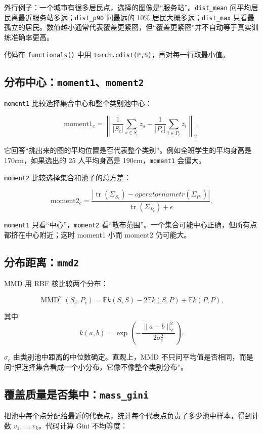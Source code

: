 \documentclass[UTF8,a4paper,12pt]{ctexart}
\newcommand{\code}[1]{\texttt{#1}}
\begin{document}
外行例子：一个城市有很多居民点，选择的图像是“服务站”。\code{dist\_mean} 问平均居民离最近服务站多远；\code{dist\_p90} 问最远的 10\% 居民大概多远；\code{dist\_max} 只看最孤立的居民。数值越小通常代表覆盖更紧密，但“覆盖更紧密”并不自动等于真实训练准确率更高。

代码在 \code{functionals()} 中用 \code{torch.cdist(P,S)}，再对每一行取最小值。

\subsection{分布中心：\code{moment1}、\code{moment2}}

\code{moment1} 比较选择集合中心和整个类别池中心：

\[
\text{moment1}_c=
\left\lVert\frac{1}{|S_c|}\sum_{s\in S_c}z_s-
\frac{1}{|P_c|}\sum_{i\in P_c}z_i\right\rVert_2.
\]

它回答“挑出来的图的平均位置是否代表整个类别”。例如全班学生的平均身高是 170cm，如果选出的 25 人平均身高是 190cm，\code{moment1} 会偏大。

\code{moment2} 比较选择集合和池子的总方差：

\[
\text{moment2}_c=
\frac{|\operatorname{tr}(\Sigma_{S_c})-operatorname{tr}(\Sigma_{P_c})|}
{\operatorname{tr}(\Sigma_{P_c})+\epsilon}.
\]

\code{moment1} 只看“中心”，\code{moment2} 看“散布范围”。一个集合可能中心正确，但所有点都挤在中心附近；这时 moment1 小而 moment2 仍可能大。

\subsection{分布距离：\code{mmd2}}

MMD 用 RBF 核比较两个分布：

\[
\operatorname{MMD}^2(S_c,P_c)=
\mathbb{E}k(S,S)-2\mathbb{E}k(S,P)+\mathbb{E}k(P,P),
\]

其中
\[
k(a,b)=\exp\left(-\frac{\lVert a-b\rVert_2^2}{2\sigma_c^2}\right).
\]

\(\sigma_c\) 由类别池中距离的中位数确定。直观上，MMD 不只问平均值是否相同，而是问“把选择集合看成一个小分布，它像不像整个类别分布”。

\subsection{覆盖质量是否集中：\code{mass\_gini}}

把池中每个点分配给最近的代表点，统计每个代表点负责了多少池中样本，得到计数 \(v_1,\ldots,v_k\)。代码计算 Gini 不均等度：
\end{document}
